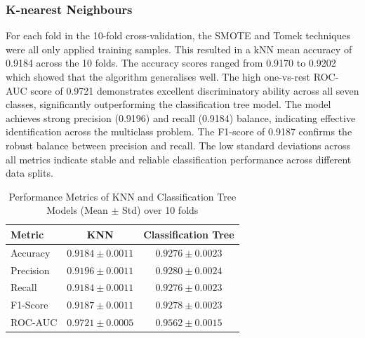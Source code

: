\documentclass[10pt, conference]{IEEEtran}
\begin{document}
\subsubsection{K-nearest Neighbours}

For each fold in the 10-fold cross-validation, the SMOTE and Tomek techniques were all only applied training samples. This resulted in a kNN mean accuracy of 0.9184 across the 10 folds. The accuracy scores ranged from 0.9170 to 0.9202 which showed that the algorithm generalises well. The high one-vs-rest ROC-AUC score of 0.9721 demonstrates excellent discriminatory ability across all seven classes, significantly outperforming the classification tree model. The model achieves strong precision (0.9196) and recall (0.9184) balance, indicating effective identification across the multiclass problem. The F1-score of 0.9187 confirms the robust balance between precision and recall. The low standard deviations across all metrics indicate stable and reliable classification performance across different data splits.

\begin{table}[htbp]
	\centering
	\caption{Performance Metrics of KNN and Classification Tree Models (Mean $\pm$ Std) over 10 folds}
	\label{tab:model_comparison}
	\begin{tabular}{|l|c|c|}
		\hline
		\textbf{Metric} & \textbf{KNN} & \textbf{Classification Tree} \\
		\hline
		Accuracy & $0.9184 \pm 0.0011$ & $0.9276 \pm 0.0023$ \\
		Precision & $0.9196 \pm 0.0011$ & $0.9280 \pm 0.0024$ \\
		Recall & $0.9184 \pm 0.0011$ & $0.9276 \pm 0.0023$ \\
		F1-Score & $0.9187 \pm 0.0011$ & $0.9278 \pm 0.0023$ \\
		ROC-AUC & $0.9721 \pm 0.0005$ & $0.9562 \pm 0.0015$ \\
		\hline
	\end{tabular}
\end{table}
\end{document}
